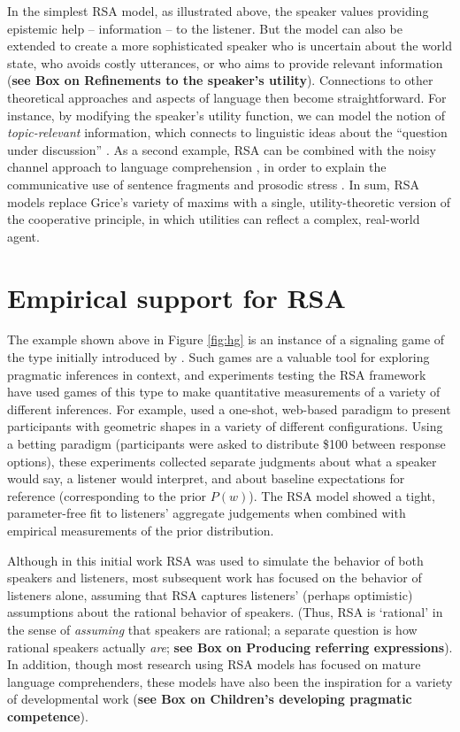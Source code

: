 \documentclass[]{elsarticle}
\begin{document}
In the simplest RSA model, as illustrated above, the speaker values
providing epistemic help -- information -- to the listener. But the model can also be extended to create a more sophisticated speaker who is uncertain
about the world state, who avoids costly utterances, or who aims to
provide relevant information (\textbf{see Box on Refinements to the speaker's utility}). Connections to
other theoretical approaches and aspects of language then become
straightforward. For instance, by modifying the speaker's utility function, we can model the notion of \emph{topic-relevant} information, which
connects to linguistic ideas about the ``question under discussion''
\citep{roberts1996}. 
As a second example, RSA can be combined with the noisy
channel approach to language comprehension \citep{levy2008},
in order to explain the communicative use of sentence fragments and prosodic stress \citep{bergen2016}. In sum, RSA models
replace Grice's variety of maxims with a single, utility-theoretic
version of the cooperative principle, in which utilities can reflect a
complex, real-world agent.

\section{Empirical support for RSA}\label{empirical-support-for-rsa}

The example shown above in Figure \ref{fig:hg} is an instance of a signaling game of the type  initially introduced by \citet{lewis1969}. Such games are a valuable tool for exploring pragmatic inferences in context, and experiments testing the
RSA framework have used games of this type to make quantitative
measurements of a variety of different inferences. For example, \citet{frank2012} used a one-shot, web-based paradigm to present
participants with geometric shapes in a variety of different
configurations. Using a betting paradigm (participants were asked to
distribute \$100 between response options), these experiments collected
separate judgments about what a speaker would say, a listener would
interpret, and about baseline expectations for reference (corresponding
to the prior $P(w)$). The RSA model showed a tight, parameter-free fit
to listeners' aggregate judgements when combined
with empirical measurements of the prior distribution.

Although in this initial work RSA was used to simulate the behavior of
both speakers and listeners, most subsequent work has focused on the
behavior of listeners alone, assuming that RSA captures listeners'
(perhaps optimistic) assumptions about the rational behavior of
speakers. (Thus, RSA is `rational' in the sense of \emph{assuming} that
speakers are rational; a separate question is how rational speakers
actually \emph{are}; \textbf{see Box on Producing referring expressions}). 
In addition, though most research using RSA models has focused on mature language comprehenders, these models have also been the inspiration for a variety of developmental work (\textbf{see Box on Children's developing pragmatic competence}).
\end{document}

